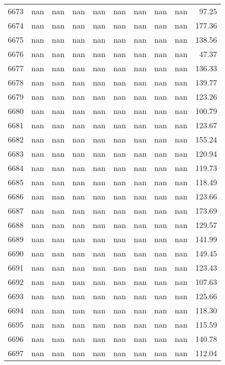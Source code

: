 \begin{tabular}{lrrrrrrrrr}
6673 & nan & nan & nan & nan & nan & nan & nan & nan & 97.25 \\
6674 & nan & nan & nan & nan & nan & nan & nan & nan & 177.36 \\
6675 & nan & nan & nan & nan & nan & nan & nan & nan & 138.56 \\
6676 & nan & nan & nan & nan & nan & nan & nan & nan & 47.37 \\
6677 & nan & nan & nan & nan & nan & nan & nan & nan & 136.33 \\
6678 & nan & nan & nan & nan & nan & nan & nan & nan & 139.77 \\
6679 & nan & nan & nan & nan & nan & nan & nan & nan & 123.26 \\
6680 & nan & nan & nan & nan & nan & nan & nan & nan & 100.79 \\
6681 & nan & nan & nan & nan & nan & nan & nan & nan & 123.67 \\
6682 & nan & nan & nan & nan & nan & nan & nan & nan & 155.24 \\
6683 & nan & nan & nan & nan & nan & nan & nan & nan & 120.94 \\
6684 & nan & nan & nan & nan & nan & nan & nan & nan & 119.73 \\
6685 & nan & nan & nan & nan & nan & nan & nan & nan & 118.49 \\
6686 & nan & nan & nan & nan & nan & nan & nan & nan & 123.66 \\
6687 & nan & nan & nan & nan & nan & nan & nan & nan & 173.69 \\
6688 & nan & nan & nan & nan & nan & nan & nan & nan & 129.57 \\
6689 & nan & nan & nan & nan & nan & nan & nan & nan & 141.99 \\
6690 & nan & nan & nan & nan & nan & nan & nan & nan & 149.45 \\
6691 & nan & nan & nan & nan & nan & nan & nan & nan & 123.43 \\
6692 & nan & nan & nan & nan & nan & nan & nan & nan & 107.63 \\
6693 & nan & nan & nan & nan & nan & nan & nan & nan & 125.66 \\
6694 & nan & nan & nan & nan & nan & nan & nan & nan & 118.30 \\
6695 & nan & nan & nan & nan & nan & nan & nan & nan & 115.59 \\
6696 & nan & nan & nan & nan & nan & nan & nan & nan & 140.78 \\
6697 & nan & nan & nan & nan & nan & nan & nan & nan & 112.04 \\

\end{tabular}
